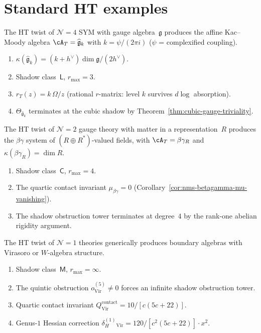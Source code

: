 \section{Standard HT examples}
\label{sec:ht-standard-examples}

\begin{example}[$\mathcal{N}=4$ SYM: affine Kac--Moody]
\label{ex:ht-n4-sym}
The HT twist of $\mathcal{N}=4$ SYM with gauge algebra~$\mathfrak{g}$
produces the affine Kac--Moody algebra
$\cA_T = \widehat{\mathfrak{g}}_k$ with
$k = \psi/(2\pi i)$ ($\psi$ = complexified coupling).
\begin{enumerate}[label=\textup{(\roman*)}]
\item $\kappa(\widehat{\mathfrak{g}}_k) = (k+h^\vee)\dim\mathfrak{g}/(2h^\vee)$.
\item Shadow class~$\mathsf{L}$, $r_{\max} = 3$.
\item $r_T(z) = k\,\Omega/z$ (rational $r$-matrix: level $k$ survives $d\log$ absorption).
\item $\Theta_{\widehat{\mathfrak{g}}_k}$ terminates at the cubic
 shadow by Theorem~\ref{thm:cubic-gauge-triviality}.
\end{enumerate}
\end{example}

\begin{example}[$\mathcal{N}=2$ with hypermultiplets: $\beta\gamma$ systems]
\label{ex:ht-n2-hyper}
The HT twist of $\mathcal{N}=2$ gauge theory with matter in a
representation~$R$ produces the $\beta\gamma$ system of
$(R \oplus R^*)$-valued fields, with
$\cA_T = \beta\gamma_R$ and
$\kappa(\beta\gamma_R) = \dim R$.
\begin{enumerate}[label=\textup{(\roman*)}]
\item Shadow class~$\mathsf{C}$, $r_{\max} = 4$.
\item The quartic contact invariant $\mu_{\beta\gamma} = 0$
 (Corollary~\ref{cor:nms-betagamma-mu-vanishing}).
\item The shadow obstruction tower terminates at degree~$4$ by the rank-one
 abelian rigidity argument.
\end{enumerate}
\end{example}

\begin{example}[$\mathcal{N}=1$: Virasoro/W-type]
\label{ex:ht-n1}
The HT twist of $\mathcal{N}=1$ theories generically produces
boundary algebras with Virasoro or $W$-algebra structure.
\begin{enumerate}[label=\textup{(\roman*)}]
\item Shadow class~$\mathsf{M}$, $r_{\max} = \infty$.
\item The quintic obstruction $o^{(5)}_{\mathrm{Vir}} \neq 0$
 forces an infinite shadow obstruction tower.
\item Quartic contact invariant
 $Q^{\mathrm{contact}}_{\mathrm{Vir}} = 10/[c(5c+22)]$.
\item Genus-$1$ Hessian correction
 $\delta_H^{(1)}_{\mathrm{Vir}} = 120/[c^2(5c+22)] \cdot x^2$.
\end{enumerate}
\end{example}

